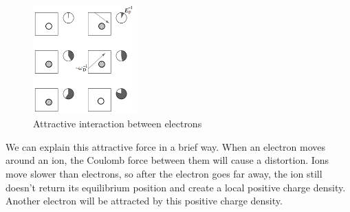 \documentclass{article}
\begin{document}
\begin{figure}[!htp]
\centering
\includegraphics[width=4cm]{./figures/pic1.png}
\caption{Attractive interaction between electrons}
\end{figure}

We can explain this attractive force in a brief way. When an electron moves around an ion, the Coulomb force between them will cause a distortion. Ions move slower than electrons, so after the electron goes far away, the ion still doesn't return its equilibrium position and create a local positive charge density. Another electron will be attracted by this positive charge density.
\end{document}
